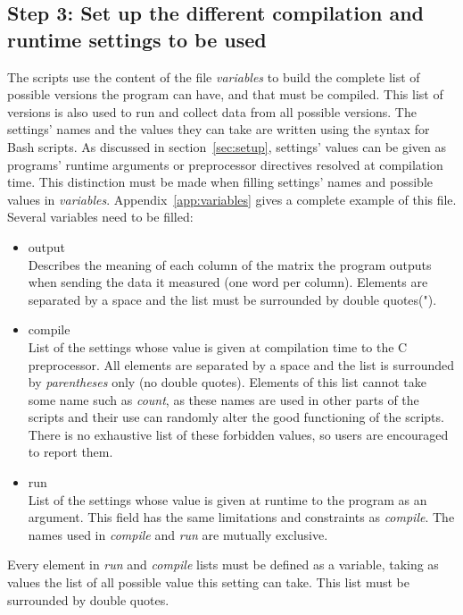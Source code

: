 \subsection{Step 3: Set up the different compilation and runtime settings to be used}
\label{sec:plan}
The scripts use the content of the file \emph{variables} to build the complete list of possible versions the program can have, and that must be compiled. This list of versions is also used to run and collect data from all possible versions. The settings' names and the values they can take are written using the syntax for Bash scripts. As discussed in section~\ref{sec:setup}, settings' values can be given as programs' runtime arguments or preprocessor directives resolved at compilation time. This distinction must be made when filling settings' names and possible values in \emph{variables}. Appendix~\ref{app:variables} gives a complete example of this file. Several variables need to be filled:
\begin{itemize}
\item output\\
Describes the meaning of each column of the matrix the program outputs when sending the data it measured (one word per column). Elements are separated by a space and the list must be surrounded by double quotes(").
\item compile\\
List of the settings whose value is given at compilation time to the {C} preprocessor. All elements are separated by a space and the list is surrounded by \emph{parentheses} only (no double quotes). Elements of this list cannot take some name such as \emph{count}, as these names are used in other parts of the scripts and their use can randomly alter the good functioning of the scripts. There is no exhaustive list of these forbidden values, so users are encouraged to report them.
\item run\\
List of the settings whose value is given at runtime to the program as an argument. This field has the same limitations and constraints as \emph{compile}. The names used in \emph{compile} and \emph{run} are mutually exclusive.
\end{itemize}
Every element in \emph{run} and \emph{compile} lists must be defined as a variable, taking as values the list of all possible value this setting can take. This list must be surrounded by double quotes.

